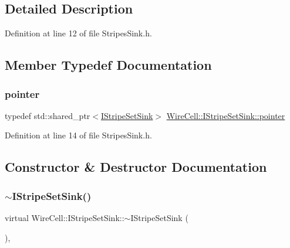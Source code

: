 \subsection{Detailed Description}


Definition at line 12 of file Stripes\+Sink.\+h.



\subsection{Member Typedef Documentation}
\mbox{\label{class_wire_cell_1_1_i_stripe_set_sink_a386ab288b8561c7ef13c4d785c3e9e6c}} 
\subsubsection{\texorpdfstring{pointer}{pointer}}
{\footnotesize\ttfamily typedef std\+::shared\+\_\+ptr$<$\hyperlink{class_wire_cell_1_1_i_stripe_set_sink}{I\+Stripe\+Set\+Sink}$>$ \hyperlink{class_wire_cell_1_1_i_stripe_set_sink_a386ab288b8561c7ef13c4d785c3e9e6c}{Wire\+Cell\+::\+I\+Stripe\+Set\+Sink\+::pointer}}



Definition at line 14 of file Stripes\+Sink.\+h.



\subsection{Constructor \& Destructor Documentation}
\mbox{\label{class_wire_cell_1_1_i_stripe_set_sink_a30dcc873885cc088b48d9f34a57daad7}} 
\subsubsection{\texorpdfstring{$\sim$\+I\+Stripe\+Set\+Sink()}{~IStripeSetSink()}}
{\footnotesize\ttfamily virtual Wire\+Cell\+::\+I\+Stripe\+Set\+Sink\+::$\sim$\+I\+Stripe\+Set\+Sink (\begin{DoxyParamCaption}{ }\end{DoxyParamCaption})\hspace{0.3cm}{\ttfamily [inline]}, {\ttfamily [virtual]}}



